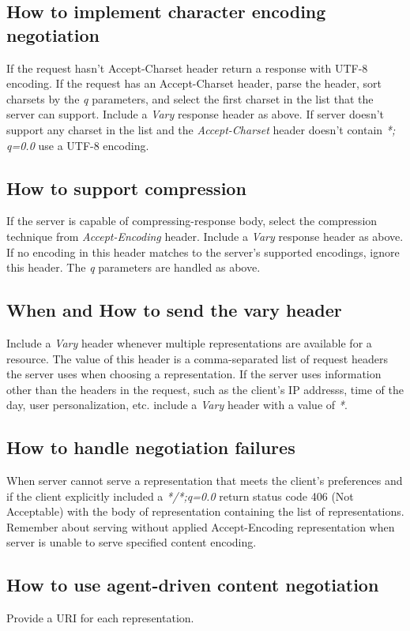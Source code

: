 \documentclass[11pt,a4paper]{article}
\begin{document}
\subsection{How to implement character encoding negotiation}
If the request hasn't Accept-Charset header return a response with UTF-8 encoding. If the request has an Accept-Charset header, parse the header, sort charsets by the \textit{q} parameters, and select the first charset in the list that the server can support. Include a \textit{Vary} response header as above. If server doesn't support any charset in the list and the \textit{Accept-Charset} header doesn't contain \textit{*; q=0.0} use a UTF-8 encoding.

\subsection{How to support compression}
If the server is capable of compressing-response body, select the compression technique from \textit{Accept-Encoding} header. Include a \textit{Vary} response header as above. If no encoding in this header matches to the server's supported encodings, ignore this header. The \textit{q} parameters are handled as above.

\subsection{When and How to send the vary header}
Include a \textit{Vary} header whenever multiple representations are available for a resource. The value of this header is a comma-separated list of request headers the server uses when choosing a representation. If the server uses information other than the headers in the request, such as the client's IP addresss, time of the day, user personalization, etc. include a \textit{Vary} header with a value of \textit{*}.

\subsection{How to handle negotiation failures}
When server cannot serve a representation that meets the client's preferences and if the client explicitly included a \textit{*/*;q=0.0} return status code 406 (Not Acceptable) with the body of representation containing the list of representations. Remember about serving without applied Accept-Encoding representation when server is unable to serve specified content encoding.

\subsection{How to use agent-driven content negotiation}
Provide a URI for each representation.
\end{document}
